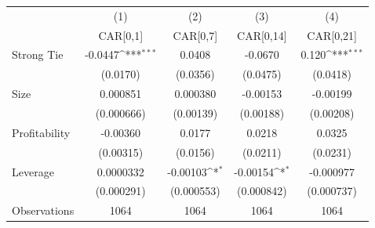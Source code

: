 {
\def\sym#1{\ifmmode^{#1}\else\(^{#1}\)\fi}
\begin{tabular}{l*{4}{c}}
\hline\hline
                    &\multicolumn{1}{c}{(1)}&\multicolumn{1}{c}{(2)}&\multicolumn{1}{c}{(3)}&\multicolumn{1}{c}{(4)}\\
                    &\multicolumn{1}{c}{CAR[0,1]}&\multicolumn{1}{c}{CAR[0,7]}&\multicolumn{1}{c}{CAR[0,14]}&\multicolumn{1}{c}{CAR[0,21]}\\
\hline
Strong Tie          &     -0.0447\sym{***}&      0.0408         &     -0.0670         &       0.120\sym{***}\\
                    &    (0.0170)         &    (0.0356)         &    (0.0475)         &    (0.0418)         \\
[1em]
Size                &    0.000851         &    0.000380         &    -0.00153         &    -0.00199         \\
                    &  (0.000666)         &   (0.00139)         &   (0.00188)         &   (0.00208)         \\
[1em]
Profitability       &    -0.00360         &      0.0177         &      0.0218         &      0.0325         \\
                    &   (0.00315)         &    (0.0156)         &    (0.0211)         &    (0.0231)         \\
[1em]
Leverage            &   0.0000332         &    -0.00103\sym{*}  &    -0.00154\sym{*}  &   -0.000977         \\
                    &  (0.000291)         &  (0.000553)         &  (0.000842)         &  (0.000737)         \\
\hline
Observations        &        1064         &        1064         &        1064         &        1064         \\
\hline\hline
\end{tabular}
}
